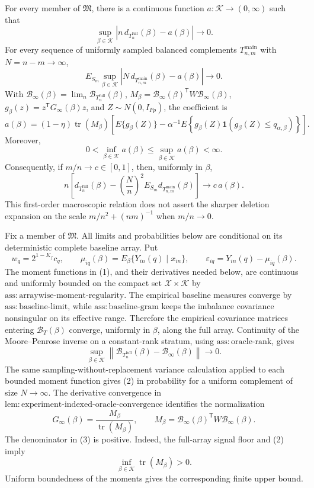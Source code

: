 For every member of \(\mathfrak M\), there is a continuous function \(a:\mathcal K\to(0,\infty)\) such that
\[
\sup_{\beta\in\mathcal K}
\left|n\,d_{T_n^{\mathrm{full}}}(\beta)-a(\beta)\right|\longrightarrow0.
\]
For every sequence of uniformly sampled balanced complements \(T_{n,m}^{\mathrm{main}}\) with \(N=n-m\to\infty\),
\[
E_{S_m}\sup_{\beta\in\mathcal K}
\left|N\,d_{T_{n,m}^{\mathrm{main}}}(\beta)-a(\beta)\right|\longrightarrow0.
\]
With \(\mathcal B_\infty(\beta)=\lim_n\mathcal B_{T_n^{\mathrm{full}}}(\beta)\), \(M_\beta=\mathcal B_\infty(\beta)^{\mathsf T}W\mathcal B_\infty(\beta)\), \(g_\beta(z)=z^{\mathsf T}G_\infty(\beta)z\), and \(Z\sim N(0,I_{Fp})\), the coefficient is
\[
a(\beta)
=(1-\eta)\operatorname{tr}(M_\beta)
\left[
E\{g_\beta(Z)\}
-\alpha^{-1}E\!\left\{g_\beta(Z)
\mathbf 1\!\left(g_\beta(Z)\leq q_{\alpha,\beta}\right)\right\}
\right].
\]
Moreover,
\[
0<\inf_{\beta\in\mathcal K}a(\beta)
\leq\sup_{\beta\in\mathcal K}a(\beta)<\infty.
\]
Consequently, if \(m/n\to c\in[0,1]\), then, uniformly in \(\beta\),
\[
n\left[
d_{T_n^{\mathrm{full}}}(\beta)
-\left(\frac{N}{n}\right)^2
E_{S_m}d_{T_{n,m}^{\mathrm{main}}}(\beta)
\right]\longrightarrow c\,a(\beta).
\]
This first-order macroscopic relation does not assert the sharper deletion expansion on the scale \(m/n^2+(nm)^{-1}\) when \(m/n\to0\).

Fix a member of \(\mathfrak M\).  All limits and probabilities below are conditional on its deterministic complete baseline array.  Put
\[
w_q=2^{1-K_f}c_q,\qquad
\mu_{iq}(\beta)=E_\beta\{Y_{in}(q)\mid x_{in}\},\qquad
\varepsilon_{iq}=Y_{in}(q)-\mu_{iq}(\beta).
\tag{1}
\]
The moment functions in (1), and their derivatives needed below, are continuous and uniformly bounded on the compact set \(\mathcal X\times\mathcal K\) by \(\mathrm{ass{:}arraywise\text{-}moment\text{-}regularity}\).  The empirical baseline measures converge by \(\mathrm{ass{:}baseline\text{-}limit}\), while \(\mathrm{ass{:}baseline\text{-}gram}\) keeps the imbalance covariance nonsingular on its effective range.  Therefore the empirical covariance matrices entering \(\mathcal B_T(\beta)\) converge, uniformly in \(\beta\), along the full array.  Continuity of the Moore--Penrose inverse on a constant-rank stratum, using \(\mathrm{ass{:}oracle\text{-}rank}\), gives
\[
\sup_{\beta\in\mathcal K}
\left\|\mathcal B_{T_n^{\mathrm{full}}}(\beta)
-\mathcal B_\infty(\beta)\right\|\longrightarrow0.
\tag{2}
\]
The same sampling-without-replacement variance calculation applied to each bounded moment function gives (2) in probability for a uniform complement of size \(N\to\infty\).  The derivative convergence in \(\mathrm{lem{:}experiment\text{-}indexed\text{-}oracle\text{-}convergence}\) identifies the normalization
\[
G_\infty(\beta)
=\frac{M_\beta}{\operatorname{tr}(M_\beta)},
\qquad
M_\beta
=\mathcal B_\infty(\beta)^{\mathsf T}
 W\mathcal B_\infty(\beta).
\tag{3}
\]
The denominator in (3) is positive.  Indeed, the full-array signal floor and (2) imply
\[
\inf_{\beta\in\mathcal K}\operatorname{tr}(M_\beta)>0.
\tag{4}
\]
Uniform boundedness of the moments gives the corresponding finite upper bound.

